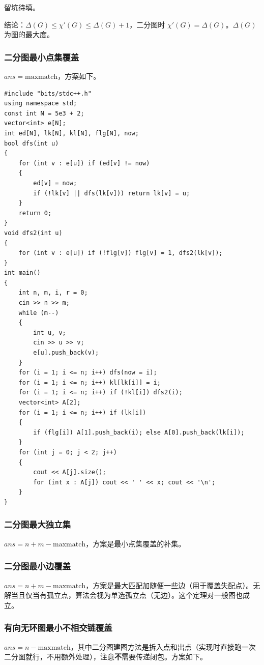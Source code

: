 \documentclass[12pt]{ctexart}
\begin{document}
留坑待填。

结论：$\Delta(G)\le \chi'(G) \le \Delta(G)+1$，二分图时 $\chi'(G)=\Delta(G)$。$\Delta(G)$ 为图的最大度。

\subsubsection{二分图最小点集覆盖}

$ans=\text{maxmatch}$，方案如下。

\begin{lstlisting}
#include "bits/stdc++.h"
using namespace std;
const int N = 5e3 + 2;
vector<int> e[N];
int ed[N], lk[N], kl[N], flg[N], now;
bool dfs(int u)
{
	for (int v : e[u]) if (ed[v] != now)
	{
		ed[v] = now;
		if (!lk[v] || dfs(lk[v])) return lk[v] = u;
	}
	return 0;
}
void dfs2(int u)
{
	for (int v : e[u]) if (!flg[v]) flg[v] = 1, dfs2(lk[v]);
}
int main()
{
	int n, m, i, r = 0;
	cin >> n >> m;
	while (m--)
	{
		int u, v;
		cin >> u >> v;
		e[u].push_back(v);
	}
	for (i = 1; i <= n; i++) dfs(now = i);
	for (i = 1; i <= n; i++) kl[lk[i]] = i;
	for (i = 1; i <= n; i++) if (!kl[i]) dfs2(i);
	vector<int> A[2];
	for (i = 1; i <= n; i++) if (lk[i])
	{
		if (flg[i]) A[1].push_back(i); else A[0].push_back(lk[i]);
	}
	for (int j = 0; j < 2; j++)
	{
		cout << A[j].size();
		for (int x : A[j]) cout << ' ' << x; cout << '\n';
	}
}
\end{lstlisting}

\subsubsection{二分图最大独立集}

$ans=n+m-\text{maxmatch}$，方案是最小点集覆盖的补集。

\subsubsection{二分图最小边覆盖}

$ans=n+m-\text{maxmatch}$，方案是最大匹配加随便一些边（用于覆盖失配点）。无解当且仅当有孤立点，算法会视为单选孤立点（无边）。这个定理对一般图也成立。

\subsubsection{有向无环图最小不相交链覆盖}

$ans=n-\text{maxmatch}$，其中二分图建图方法是拆入点和出点（实现时直接跑一次二分图就行，不用额外处理），注意\textbf{不}需要传递闭包。方案如下。
\end{document}
